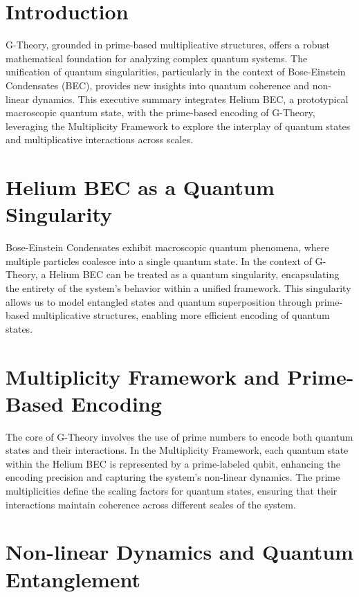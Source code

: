 \documentclass[%
 preprint, linenumbers,
 amsmath,amssymb,
 aps, physrev,
]{revtex4-2}
\begin{document}
\section{Introduction}

G-Theory, grounded in prime-based multiplicative structures, offers a robust mathematical foundation for analyzing complex quantum systems. The unification of quantum singularities, particularly in the context of Bose-Einstein Condensates (BEC), provides new insights into quantum coherence and non-linear dynamics. This executive summary integrates Helium BEC, a prototypical macroscopic quantum state, with the prime-based encoding of G-Theory, leveraging the Multiplicity Framework to explore the interplay of quantum states and multiplicative interactions across scales.

\section{Helium BEC as a Quantum Singularity}

Bose-Einstein Condensates exhibit macroscopic quantum phenomena, where multiple particles coalesce into a single quantum state. In the context of G-Theory, a Helium BEC can be treated as a quantum singularity, encapsulating the entirety of the system's behavior within a unified framework. This singularity allows us to model entangled states and quantum superposition through prime-based multiplicative structures, enabling more efficient encoding of quantum states.

\section{Multiplicity Framework and Prime-Based Encoding}

The core of G-Theory involves the use of prime numbers to encode both quantum states and their interactions. In the Multiplicity Framework, each quantum state within the Helium BEC is represented by a prime-labeled qubit, enhancing the encoding precision and capturing the system's non-linear dynamics. The prime multiplicities define the scaling factors for quantum states, ensuring that their interactions maintain coherence across different scales of the system.

\section{Non-linear Dynamics and Quantum Entanglement}
\end{document}
